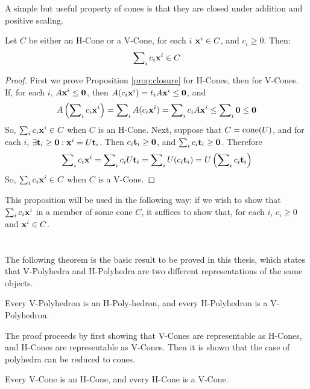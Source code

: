 A simple but useful property of cones is that they are closed under addition and positive scaling.

\begin{Prop}\label{prop:closure}
	Let $C$ be either an H-Cone or a V-Cone, for each $i$ $\mathbf{x}^i \in C$, and $c_i \geq 0$.  Then:
	\[ \sum\nolimits_i c_i \mathbf{x}^i \in C \]
\end{Prop}

\begin{proof}
	First we prove Proposition \ref{prop:closure} for H-Cones, then for V-Cones.
	If, for each $i$, $A\mathbf{x}^i \leq \mathbf{0}$, then $A(c_i\mathbf{x}^i) = t_iA\mathbf{x}^i \leq \mathbf{0}$, and
	\[ A\left(\sum\nolimits_i c_i\mathbf{x}^i\right) = \sum\nolimits_i A (c_i\mathbf{x}^i) =
		\sum\nolimits_i c_i A\mathbf{x}^i \leq \sum\nolimits_i \mathbf{0} \leq \mathbf{0} \]
	So, $\sum\nolimits_i c_i\mathbf{x}^i \in C$ when $C$ is an H-Cone.  Next, suppose that $C = \operatorname{cone}(U)$, and for each $i$, $\exists \mathbf{t}_i \geq \mathbf{0}: \mathbf{x}^i = U\mathbf{t}_i$.  Then $c_i\mathbf{t}_i \geq \mathbf{0}$, and $\sum\nolimits_i c_i\mathbf{t}_i \geq \mathbf{0}$.  Therefore
	\[ \sum\nolimits_i c_i\mathbf{x}^i = \sum\nolimits_i c_i U\mathbf{t}_i = \sum\nolimits_i U(c_i\mathbf{t}_i)
		= U\left(\sum\nolimits_i c_i\mathbf{t}_i\right) \]
	So, $\sum\nolimits_i c_i\mathbf{x}^i \in C$ when $C$ is a V-Cone.
\end{proof}

This proposition will be used in the following way: if we wish to show that $\sum\nolimits_i c_i\mathbf{x}^i$ in a member of some cone $C$, it suffices to show that, for each $i$, $c_i \geq 0$ and $\mathbf{x}^i \in C$.


\section{\MWT}

The following theorem is the basic result to be proved in this thesis, which states that V-Polyhedra and H-Polyhedra are two different representations of the same objects.

\begin{Thm}[{\MWT}]{
		Every V-Polyhedron is an H-Poly-hedron, and every H-Polyhedron is a V-Polyhedron.
	}\end{Thm}

The proof proceeds by first showing that V-Cones are representable as H-Cones, and H-Cones are representable as V-Cones.  Then it is shown that the case of polyhedra can be reduced to cones.

\begin{Thm}{
		Every V-Cone is an H-Cone, and every H-Cone is a V-Cone.
	}\end{Thm}

